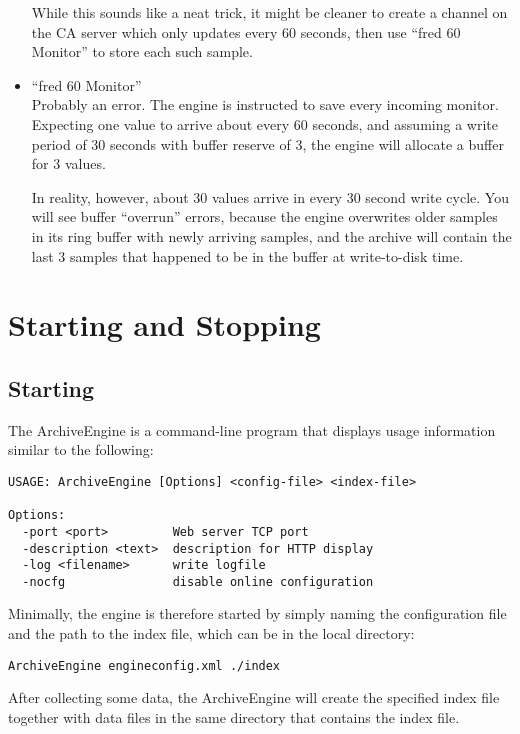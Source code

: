 \begin{itemize}
      While this sounds like a neat trick, it might be cleaner to
      create a channel on the CA server which only updates every 60
      seconds, then use ``fred 60 Monitor'' to store each such sample.
\item ``fred 60 Monitor''\\
      Probably an error. The engine is instructed to save every
      incoming monitor. Expecting one value to arrive about every 60
      seconds, and assuming a write period of 30 seconds with buffer
      reserve of 3, the engine will allocate a buffer for 3 values.

      In reality, however, about 30 values arrive in every 30 second
      write cycle. You will see buffer ``overrun'' errors, because the
      engine overwrites older samples in its ring buffer with newly
      arriving samples, and the archive will contain the last 3
      samples that happened to be in the buffer at write-to-disk time.
\end{itemize}

\section{Starting and Stopping}
\subsection{Starting}
The ArchiveEngine is a command-line program that displays usage
information similar to the following:

\begin{lstlisting}[frame=none,keywordstyle=\sffamily]
USAGE: ArchiveEngine [Options] <config-file> <index-file>
 
Options:
  -port <port>         Web server TCP port
  -description <text>  description for HTTP display
  -log <filename>      write logfile
  -nocfg               disable online configuration
\end{lstlisting}

\noindent Minimally, the engine is therefore started by simply naming the
configuration file and the path to the index file, which can be in the
local directory:

\begin{lstlisting}[frame=none,keywordstyle=\sffamily]
ArchiveEngine engineconfig.xml ./index
\end{lstlisting}

\noindent After collecting some data, the ArchiveEngine will create the
specified index file together with data files in the same directory
that contains the index file.

